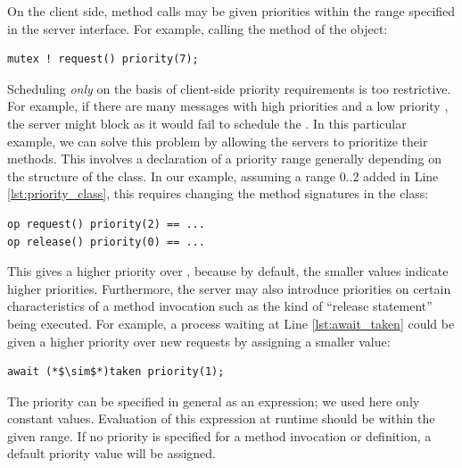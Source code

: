 On the client side, method calls may be given priorities within the range specified in the server interface. For example, calling the  method of the  object: 

\begin{lstlisting}[frame=none, numbers=none]
mutex ! request() priority(7);
\end{lstlisting}


Scheduling \textit{only} on the basis of client-side priority requirements is too restrictive.
For example, if there are many  messages with high priorities and a low priority , the server might block as it would fail to schedule the .
In this particular example, we can solve this problem by allowing the servers to
prioritize their methods.
This involves a declaration of a priority range generally depending on the structure of the class. 
In our example, assuming a range 0..2 added in Line \ref{lst:priority_class}, this requires changing the method signatures in the {} class: 

\begin{lstlisting}[frame=none, numbers=none]
op request() priority(2) == ...
op release() priority(0) == ...
\end{lstlisting}


This gives   a higher priority over , because by default, the smaller values indicate higher priorities.
Furthermore, the server may also introduce priorities on certain 
characteristics of a method invocation such as the kind of ``release statement''
being executed. 
For example, a process waiting at Line \ref{lst:await_taken} could be given a higher priority over new requests by assigning a smaller value:

\begin{lstlisting}[frame=none, numbers=none]
await (*$\sim$*)taken priority(1);
\end{lstlisting}


The priority can be specified in general as an expression; we used here
only constant values.
Evaluation of this expression at runtime should be within the given
range.
If no priority is specified for a method invocation or definition, a
default priority value will be assigned.

% 

